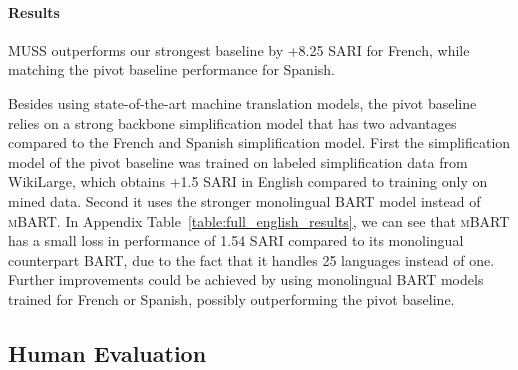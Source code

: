\documentclass[11pt]{article}
\newcommand{\wikilarge}{WikiLarge\xspace}
\newcommand{\muss}{\textsc{MUSS}\xspace}
\newcommand{\bart}{\textsc{BART}\xspace}
\newcommand{\mbart}{\textsc{mBART}\xspace}
\begin{document}
\paragraph{Results}
\muss outperforms our strongest baseline by +8.25 SARI for French, while matching the pivot baseline performance for Spanish.

Besides using state-of-the-art machine translation models, the pivot baseline relies on a strong backbone simplification model that has two advantages compared to the French and Spanish simplification model.
First the simplification model of the pivot baseline was trained on labeled simplification data from \wikilarge, which obtains +1.5 SARI in English compared to training only on mined data.
Second it uses the stronger monolingual \bart model instead of \mbart. In Appendix Table~\ref{table:full_english_results}, we can see that \mbart has a small loss in performance of 1.54 SARI compared to its monolingual counterpart \bart, due to the fact that it handles 25 languages instead of one. Further improvements could be achieved by using monolingual \bart models trained for French or Spanish, possibly outperforming the pivot baseline.





\subsection{Human Evaluation}
\end{document}
